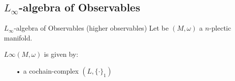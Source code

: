 \documentclass[10pt]{beamer}
\begin{document}
    \subsection{$L_\infty$-algebra of Observables}
      \begin{frame}[fragile,t]{$L_\infty$-algebra of Observables (higher observables) }
        Let be $(M,\omega)$ a $n$-plectic manifold.
        \begin{defblock}
    
          \hspace{.25em} $L\infty(M,\omega)$ is given by:
    
          \begin{itemize}
            \item[•] a cochain-complex $(L,\{\cdot\}_1)$
          \end{itemize}
          \begin{center}
            \ifHandout
            
            \else
            
            \fi
          \end{center}
        \end{defblock}
      \end{frame}
\end{document}
